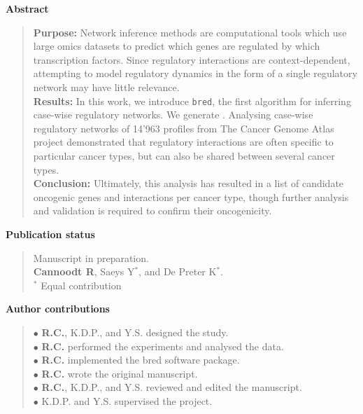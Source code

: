 \documentclass[8pt]{book}
\newif\ifrenderall
\begin{document}
{\large \textbf{Abstract}}
\begin{quote}
	\textbf{Purpose:} Network inference methods are computational tools which use large omics datasets to predict which genes are regulated by which transcription factors.
	Since regulatory interactions are context-dependent, attempting to model regulatory dynamics in the form of a single regulatory network may have little relevance. \\
	\textbf{Results:} In this work, we introduce \texttt{bred}, the first algorithm for inferring case-wise regulatory networks. We generate . Analysing case-wise regulatory networks of 14'963 profiles from The Cancer Genome Atlas project demonstrated that regulatory interactions are often specific to particular cancer types, but can also be shared between several cancer types. \\
	\textbf{Conclusion:} Ultimately, this analysis has resulted in a list of candidate oncogenic genes and interactions per cancer type, though further analysis and validation is required to confirm their oncogenicity.
\end{quote}
\vfill
{\large \textbf{Publication status}}
\begin{quote}
	Manuscript in preparation. \\
	\textbf{Cannoodt R}, Saeys Y$^*$, and De Preter K$^*$. \\
	{\footnotesize $^*$ Equal contribution}
\end{quote}

\vfill
{\large \textbf{Author contributions}}
\begin{quote}
	$\bullet$ \textbf{R.C.}, K.D.P., and Y.S. designed the study.\\
	$\bullet$ \textbf{R.C.} performed the experiments and analysed the data.\\
	$\bullet$ \textbf{R.C.} implemented the bred software package.\\
	$\bullet$ \textbf{R.C.} wrote the original manuscript.\\
	$\bullet$ \textbf{R.C.}, K.D.P., and Y.S. reviewed and edited the manuscript. \\
	$\bullet$ K.D.P. and Y.S. supervised the project.
\end{quote}

\vfill

\ifrenderall
\newpage
\graphicspath{{./ch6_bred/}}

\fi 
\newpage{\thispagestyle{empty}\cleardoublepage}
\end{document}
